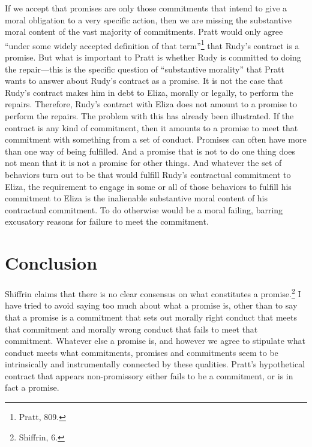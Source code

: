 If we accept that promises are only those commitments that intend to
give a moral obligation to a very specific action, then we are missing
the substantive moral content of the vast majority of commitments. Pratt
would only agree ``under some widely accepted definition of that
term''\footnote{Pratt, 809.} that Rudy's contract is a promise. But what
is important to Pratt is whether Rudy is committed to doing the
repair---this is the specific question of ``substantive morality'' that
Pratt wants to answer about Rudy's contract as a promise. It is not the
case that Rudy's contract makes him in debt to Eliza, morally or
legally, to perform the repairs. Therefore, Rudy's contract with Eliza
does not amount to a promise to perform the repairs. The problem with
this has already been illustrated. If the contract is any kind of
commitment, then it amounts to a promise to meet that commitment with
something from a set of conduct. Promises can often have more than one
way of being fulfilled. And a promise that is not to do one thing does
not mean that it is not a promise for other things. And whatever the set
of behaviors turn out to be that would fulfill Rudy's contractual
commitment to Eliza, the requirement to engage in some or all of those
behaviors to fulfill his commitment to Eliza is the inalienable
substantive moral content of his contractual commitment. To do otherwise
would be a moral failing, barring excusatory reasons for failure to meet
the commitment.

\section{Conclusion}

Shiffrin claims that there is no clear consensus on what constitutes a
promise.\footnote{Shiffrin, 6.} I have tried to avoid saying too much
about what a promise is, other than to say that a promise is a
commitment that sets out morally right conduct that meets that
commitment and morally wrong conduct that fails to meet that commitment.
Whatever else a promise is, and however we agree to stipulate what
conduct meets what commitments, promises and commitments seem to be
intrinsically and instrumentally connected by these qualities. Pratt's
hypothetical contract that appears non-promissory either fails to be a
commitment, or is in fact a promise.

\clearpage
